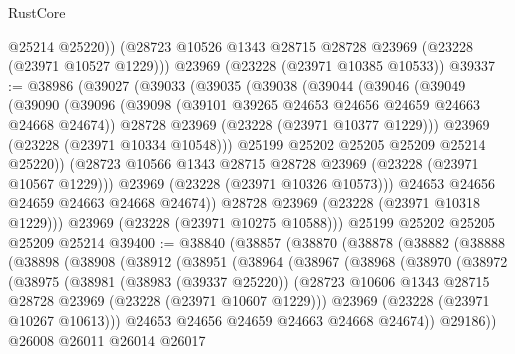 \begin{lexlean}{RustCore}
\begin{coremodule}
        @25214
        @25220))
    (@28723 @10526 @1343 @28715 @28728 @23969 (@23228 (@23971 @10527 @1229)))
    @23969
    (@23228 (@23971 @10385 @10533))
@39337 := @38986
    (@39027
      (@39033
        (@39035
          (@39038
            (@39044
              (@39046
                (@39049
                  (@39090
                    (@39096
                      (@39098 (@39101 @39265 @24653 @24656 @24659 @24663 @24668 @24674))
                      @28728
                      @23969
                      (@23228 (@23971 @10377 @1229)))
                    @23969
                    (@23228 (@23971 @10334 @10548)))
                  @25199
                  @25202
                  @25205
                  @25209
                  @25214
                  @25220))
              (@28723 @10566 @1343 @28715 @28728 @23969 (@23228 (@23971 @10567 @1229)))
              @23969
              (@23228 (@23971 @10326 @10573)))
            @24653
            @24656
            @24659
            @24663
            @24668
            @24674))
        @28728
        @23969
        (@23228 (@23971 @10318 @1229)))
      @23969
      (@23228 (@23971 @10275 @10588)))
    @25199
    @25202
    @25205
    @25209
    @25214
@39400 := @38840
    (@38857
      (@38870
        (@38878
          (@38882
            (@38888
              (@38898
                (@38908
                  (@38912
                    (@38951
                      (@38964
                        (@38967
                          (@38968
                            (@38970
                              (@38972
                                (@38975
                                  (@38981
                                    (@38983 (@39337 @25220))
                                    (@28723
                                      @10606
                                      @1343
                                      @28715
                                      @28728
                                      @23969
                                      (@23228 (@23971 @10607 @1229)))
                                    @23969
                                    (@23228 (@23971 @10267 @10613)))
                                  @24653
                                  @24656
                                  @24659
                                  @24663
                                  @24668
                                  @24674))
                              @29186))
                          @26008
                          @26011
                          @26014
                          @26017

\end{coremodule}
\end{lexlean}

